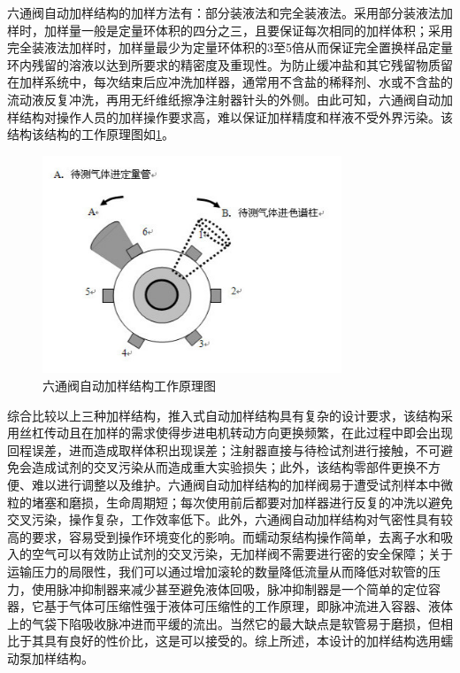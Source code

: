 六通阀自动加样结构的加样方法有：部分装液法和完全装液法。采用部分装液法加样时，加样量一般是定量环体积的四分之三，且要保证每次相同的加样体积；采用完全装液法加样时，加样量最少为定量环体积的3至5倍从而保证完全置换样品定量环内残留的溶液以达到所要求的精密度及重现性。为防止缓冲盐和其它残留物质留在加样系统中，每次结束后应冲洗加样器，通常用不含盐的稀释剂、水或不含盐的流动液反复冲洗，再用无纤维纸擦净注射器针头的外侧。由此可知，六通阀自动加样结构对操作人员的加样操作要求高，难以保证加样精度和样液不受外界污染。该结构该结构的工作原理图如\ref{fig:2-3}。

\begin{figure}[htbp!]
  \centering
  \includegraphics[height=6.5cm]{chap/figure/2-3.jpg}
  \caption{六通阀自动加样结构工作原理图}
  \label{fig:2-3}
\end{figure}

综合比较以上三种加样结构，推入式自动加样结构具有复杂的设计要求，该结构采用丝杠传动且在加样的需求使得步进电机转动方向更换频繁，在此过程中即会出现回程误差，进而造成取样体积出现误差；注射器直接与待检试剂进行接触，不可避免会造成试剂的交叉污染从而造成重大实验损失；此外，该结构零部件更换不方便、难以进行调整以及维护。六通阀自动加样结构的加样阀易于遭受试剂样本中微粒的堵塞和磨损，生命周期短；每次使用前后都要对加样器进行反复的冲洗以避免交叉污染，操作复杂，工作效率低下。此外，六通阀自动加样结构对气密性具有较高的要求，容易受到操作环境变化的影响。而蠕动泵结构操作简单，去离子水和吸入的空气可以有效防止试剂的交叉污染，无加样阀不需要进行密的安全保障；关于运输压力的局限性，我们可以通过增加滚轮的数量降低流量从而降低对软管的压力，使用脉冲抑制器来减少甚至避免液体回吸，脉冲抑制器是一个简单的定位容器，它基于气体可压缩性强于液体可压缩性的工作原理，即脉冲流进入容器、液体上的气袋下陷吸收脉冲进而平缓的流出。当然它的最大缺点是软管易于磨损，但相比于其具有良好的性价比，这是可以接受的。综上所述，本设计的加样结构选用蠕动泵加样结构。



















